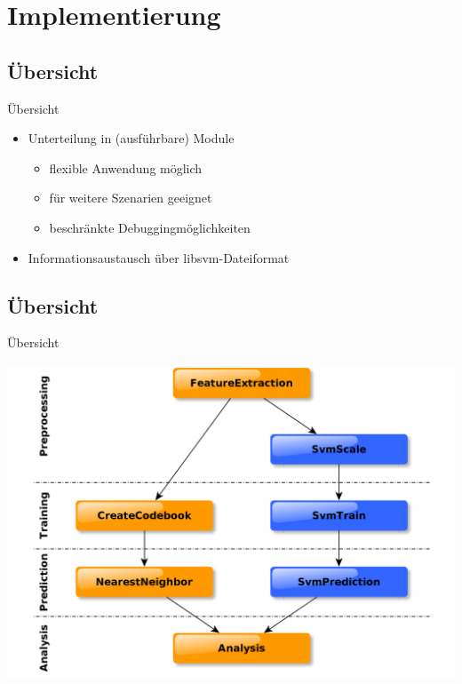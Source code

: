 \section{Implementierung}

\subsection{Übersicht}
\begin{frame}{Übersicht}
	\begin{itemize}[<+->]
		\item Unterteilung in (ausführbare) Module
		\begin{itemize}[<1->]
			\item[\textcolor{green}{\ding{223}}] flexible Anwendung möglich
			\item[\textcolor{green}{\ding{223}}] für weitere Szenarien geeignet
			\item[\textcolor{red}{\ding{223}}] beschränkte Debuggingmöglichkeiten
		\end{itemize}
		\item Informationsaustausch über libsvm-Dateiformat
	\end{itemize}
\end{frame}

\subsection{Übersicht}
\begin{frame}{Übersicht}
	\begin{center}
		\includegraphics[width=1.0\textwidth]{img/moduluebersicht}
	\end{center}
\end{frame}

